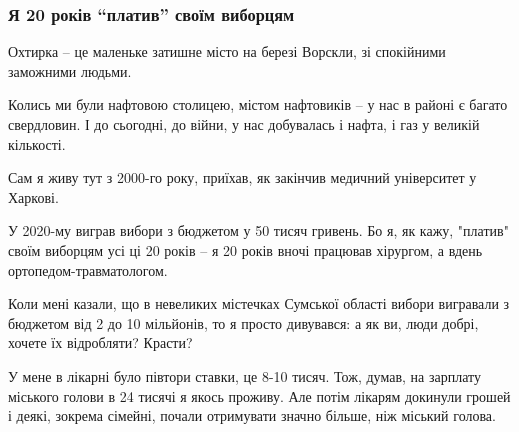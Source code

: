 
 
 
 
 

\subsubsection{Я 20 років \enquote{платив} своїм виборцям}

Охтирка – це маленьке затишне місто на березі Ворскли, зі спокійними заможними
людьми. 

Колись ми були нафтовою столицею, містом нафтовиків – у нас в районі є багато
свердловин. І до сьогодні, до війни, у нас добувалась і нафта, і газ у великій
кількості. 

Сам я живу тут з 2000-го року, приїхав, як закінчив медичний університет у
Харкові. 

У 2020-му виграв вибори з бюджетом у 50 тисяч гривень. Бо я, як кажу, "платив"
своїм виборцям усі ці 20 років – я 20 років вночі працював хірургом, а вдень
ортопедом-травматологом.


Коли мені казали, що в невеликих містечках Сумської області вибори вигравали з
бюджетом від 2 до 10 мільйонів, то я просто дивувався: а як ви, люди добрі,
хочете їх відробляти? Красти?

У мене в лікарні було півтори ставки, це 8-10 тисяч. Тож, думав, на зарплату
міського голови в 24 тисячі я якось проживу. Але потім лікарям докинули грошей
і деякі, зокрема сімейні, почали отримувати значно більше, ніж міський голова.

